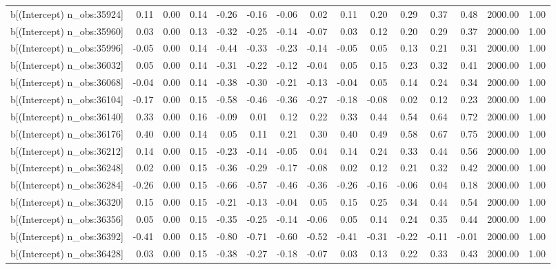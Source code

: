 \begin{table}[ht]
\begin{tabular}{rrrrrrrrrrrrrrr}
  b[(Intercept) n\_obs:35924] & 0.11 & 0.00 & 0.14 & -0.26 & -0.16 & -0.06 & 0.02 & 0.11 & 0.20 & 0.29 & 0.37 & 0.48 & 2000.00 & 1.00 \\ 
  b[(Intercept) n\_obs:35960] & 0.03 & 0.00 & 0.13 & -0.32 & -0.25 & -0.14 & -0.07 & 0.03 & 0.12 & 0.20 & 0.29 & 0.37 & 2000.00 & 1.00 \\ 
  b[(Intercept) n\_obs:35996] & -0.05 & 0.00 & 0.14 & -0.44 & -0.33 & -0.23 & -0.14 & -0.05 & 0.05 & 0.13 & 0.21 & 0.31 & 2000.00 & 1.00 \\ 
  b[(Intercept) n\_obs:36032] & 0.05 & 0.00 & 0.14 & -0.31 & -0.22 & -0.12 & -0.04 & 0.05 & 0.15 & 0.23 & 0.32 & 0.41 & 2000.00 & 1.00 \\ 
  b[(Intercept) n\_obs:36068] & -0.04 & 0.00 & 0.14 & -0.38 & -0.30 & -0.21 & -0.13 & -0.04 & 0.05 & 0.14 & 0.24 & 0.34 & 2000.00 & 1.00 \\ 
  b[(Intercept) n\_obs:36104] & -0.17 & 0.00 & 0.15 & -0.58 & -0.46 & -0.36 & -0.27 & -0.18 & -0.08 & 0.02 & 0.12 & 0.23 & 2000.00 & 1.00 \\ 
  b[(Intercept) n\_obs:36140] & 0.33 & 0.00 & 0.16 & -0.09 & 0.01 & 0.12 & 0.22 & 0.33 & 0.44 & 0.54 & 0.64 & 0.72 & 2000.00 & 1.00 \\ 
  b[(Intercept) n\_obs:36176] & 0.40 & 0.00 & 0.14 & 0.05 & 0.11 & 0.21 & 0.30 & 0.40 & 0.49 & 0.58 & 0.67 & 0.75 & 2000.00 & 1.00 \\ 
  b[(Intercept) n\_obs:36212] & 0.14 & 0.00 & 0.15 & -0.23 & -0.14 & -0.05 & 0.04 & 0.14 & 0.24 & 0.33 & 0.44 & 0.56 & 2000.00 & 1.00 \\ 
  b[(Intercept) n\_obs:36248] & 0.02 & 0.00 & 0.15 & -0.36 & -0.29 & -0.17 & -0.08 & 0.02 & 0.12 & 0.21 & 0.32 & 0.42 & 2000.00 & 1.00 \\ 
  b[(Intercept) n\_obs:36284] & -0.26 & 0.00 & 0.15 & -0.66 & -0.57 & -0.46 & -0.36 & -0.26 & -0.16 & -0.06 & 0.04 & 0.18 & 2000.00 & 1.00 \\ 
  b[(Intercept) n\_obs:36320] & 0.15 & 0.00 & 0.15 & -0.21 & -0.13 & -0.04 & 0.05 & 0.15 & 0.25 & 0.34 & 0.44 & 0.54 & 2000.00 & 1.00 \\ 
  b[(Intercept) n\_obs:36356] & 0.05 & 0.00 & 0.15 & -0.35 & -0.25 & -0.14 & -0.06 & 0.05 & 0.14 & 0.24 & 0.35 & 0.44 & 2000.00 & 1.00 \\ 
  b[(Intercept) n\_obs:36392] & -0.41 & 0.00 & 0.15 & -0.80 & -0.71 & -0.60 & -0.52 & -0.41 & -0.31 & -0.22 & -0.11 & -0.01 & 2000.00 & 1.00 \\ 
  b[(Intercept) n\_obs:36428] & 0.03 & 0.00 & 0.15 & -0.38 & -0.27 & -0.18 & -0.07 & 0.03 & 0.13 & 0.22 & 0.33 & 0.43 & 2000.00 & 1.00 \\ 

\end{tabular}
\end{table}
